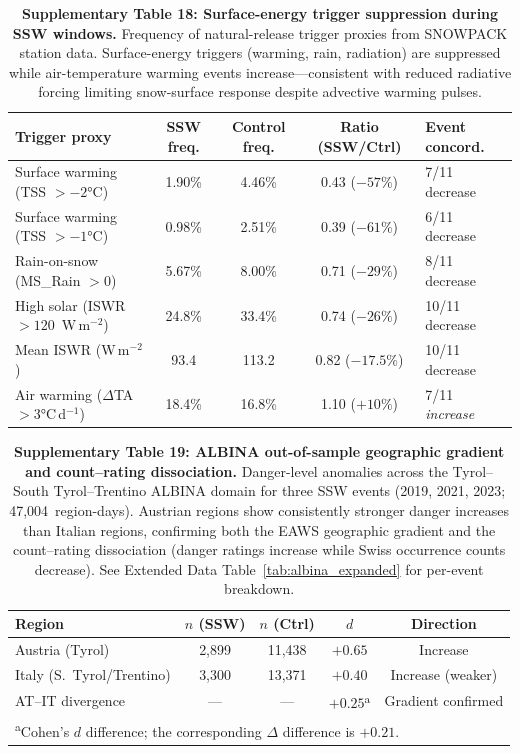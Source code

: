 \begin{table}[!ht]
\centering
\caption{\textbf{Supplementary Table 18: Surface-energy trigger suppression during SSW windows.}
Frequency of natural-release trigger proxies from SNOWPACK station data. Surface-energy triggers (warming, rain, radiation) are suppressed while air-temperature warming events increase---consistent with reduced radiative forcing limiting snow-surface response despite advective warming pulses.}
\label{tab:triggers}
\small
\begin{tabular}{lcccl}
\toprule
Trigger proxy & SSW freq. & Control freq. & Ratio (SSW/Ctrl) & Event concord. \\
\midrule
Surface warming (TSS $> -2$°C) & 1.90\% & 4.46\% & 0.43 ($-57\%$) & 7/11 decrease \\
Surface warming (TSS $> -1$°C) & 0.98\% & 2.51\% & 0.39 ($-61\%$) & 6/11 decrease \\
Rain-on-snow (MS\_Rain $> 0$) & 5.67\% & 8.00\% & 0.71 ($-29\%$) & 8/11 decrease \\
High solar (ISWR $> 120$~W\,m$^{-2}$) & 24.8\% & 33.4\% & 0.74 ($-26\%$) & 10/11 decrease \\
Mean ISWR (W\,m$^{-2}$) & 93.4 & 113.2 & 0.82 ($-17.5\%$) & 10/11 decrease \\
\midrule
Air warming ($\Delta$TA $> 3$°C\,d$^{-1}$) & 18.4\% & 16.8\% & 1.10 ($+10\%$) & 7/11 \emph{increase} \\
\bottomrule
\end{tabular}
\end{table}

\begin{table}[!ht]
\centering
\caption{\textbf{Supplementary Table 19: ALBINA out-of-sample geographic gradient and count--rating dissociation.}
Danger-level anomalies across the Tyrol--South Tyrol--Trentino ALBINA domain for three SSW events (2019, 2021, 2023; 47,004~region-days). Austrian regions show consistently stronger danger increases than Italian regions, confirming both the EAWS geographic gradient and the count--rating dissociation (danger ratings increase while Swiss occurrence counts decrease). See Extended Data Table~\ref{tab:albina_expanded} for per-event breakdown.}
\label{tab:albina}
\small
\begin{tabular}{lcccc}
\toprule
Region & $n$ (SSW) & $n$ (Ctrl) & $d$ & Direction \\
\midrule
Austria (Tyrol) & 2,899 & 11,438 & $+0.65$ & Increase \\
Italy (S.\ Tyrol/Trentino) & 3,300 & 13,371 & $+0.40$ & Increase (weaker) \\
\midrule
AT--IT divergence & --- & --- & $+0.25$\textsuperscript{a} & Gradient confirmed \\
\bottomrule
\multicolumn{5}{l}{\footnotesize \textsuperscript{a}Cohen's $d$ difference; the corresponding $\Delta$ difference is $+0.21$.} \\
\end{tabular}
\end{table}

